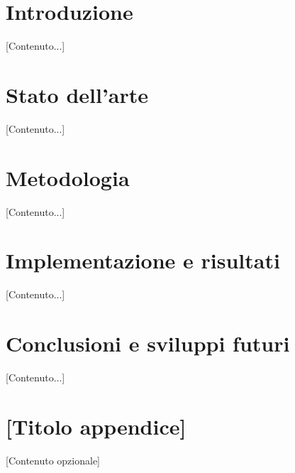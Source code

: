 \documentclass[12pt,a4paper,oneside,openright]{report}
\begin{document}
\tableofcontents
\listoffigures
\listoftables

\chapter{Introduzione}
\label{ch:intro}
[Contenuto...]

\chapter{Stato dell'arte}
[Contenuto...]

\chapter{Metodologia}
[Contenuto...]

\chapter{Implementazione e risultati}
[Contenuto...]

\chapter{Conclusioni e sviluppi futuri}
[Contenuto...]

\printbibliography[heading=bibintoc, title={Bibliografia}]

\appendix
\chapter{[Titolo appendice]}
[Contenuto opzionale]
\end{document}
